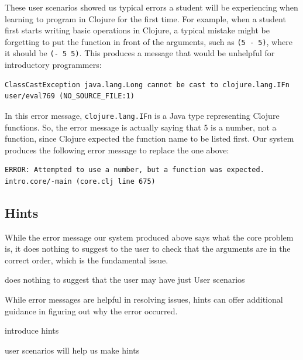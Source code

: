 \documentclass[12pt]{article}
\newcommand{\comment}[1]{{\bf \tt  {#1}}}
\newcommand{\emcomment}[1]{\textcolor{ForestGreen}{\comment{Elena: {#1}}}}
\begin{document}
These user scenarios showed us typical errors a student will be experiencing when learning to program in Clojure for the first time.
For example, when a student first starts writing basic operations in Clojure, a typical mistake might be forgetting to put the function in front of the arguments,
such as \texttt{(5 - 5)}, where it should be \texttt{(- 5 5)}. 
This produces a message that would be unhelpful for introductory programmers: 

\begin{verbatim}
ClassCastException java.lang.Long cannot be cast to clojure.lang.IFn
user/eval769 (NO_SOURCE_FILE:1)
\end{verbatim}

In this error message, \texttt{clojure.lang.IFn} is a Java type representing Clojure functions. So, the error message is actually saying that 5 is a number, not a function, since Clojure expected the function name to be listed first. Our system produces the following error message to replace the one above:

\begin{verbatim}
ERROR: Attempted to use a number, but a function was expected.
intro.core/-main (core.clj line 675)
\end{verbatim}


\subsection{Hints}\label{sec:hints}

While the error message our system produced above says what the core problem is, it does nothing to suggest to the user to check that the arguments are in the correct order, which is the fundamental issue. 


does nothing to suggest that the user may have just 
User scenarios

While error messages are helpful in resolving issues, hints can offer additional guidance in figuring out why the error occurred. 

introduce hints

user scenarios will help us make hints
\end{document}
